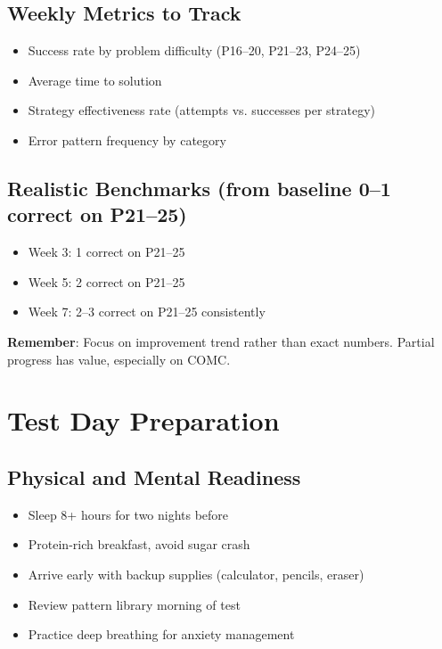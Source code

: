 \documentclass[]{article}
\begin{document}
\subsection{Weekly Metrics to Track}
\begin{itemize}[leftmargin=*]
    \item Success rate by problem difficulty (P16--20, P21--23, P24--25)
    \item Average time to solution
    \item Strategy effectiveness rate (attempts vs. successes per strategy)
    \item Error pattern frequency by category
\end{itemize}

\subsection{Realistic Benchmarks (from baseline 0--1 correct on P21--25)}
\begin{itemize}[leftmargin=*]
    \item Week 3: 1 correct on P21--25
    \item Week 5: 2 correct on P21--25
    \item Week 7: 2--3 correct on P21--25 consistently
\end{itemize}

\textbf{Remember}: Focus on improvement trend rather than exact numbers. Partial progress has value, especially on COMC.

\section{Test Day Preparation}

\subsection{Physical and Mental Readiness}
\begin{itemize}[leftmargin=*]
    \item Sleep 8+ hours for two nights before
    \item Protein-rich breakfast, avoid sugar crash
    \item Arrive early with backup supplies (calculator, pencils, eraser)
    \item Review pattern library morning of test
    \item Practice deep breathing for anxiety management
\end{itemize}
\end{document}
